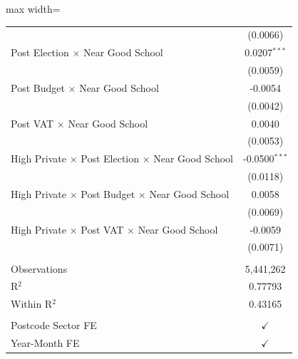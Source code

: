 \begin{table}[htbp]
\begin{adjustbox}{max width=\textwidth}
\begin{tabular}{lc}
                                                                              & (0.0066)\\
      Post Election $\times$ Near Good School                                 & 0.0207$^{***}$\\
                                                                              & (0.0059)\\
      Post Budget $\times$ Near Good School                                   & -0.0054\\
                                                                              & (0.0042)\\
      Post VAT $\times$ Near Good School                                      & 0.0040\\
                                                                              & (0.0053)\\
      High Private $\times$ Post Election $\times$ Near Good School           & -0.0500$^{***}$\\
                                                                              & (0.0118)\\
      High Private $\times$ Post Budget $\times$ Near Good School             & 0.0058\\
                                                                              & (0.0069)\\
      High Private $\times$ Post VAT $\times$ Near Good School                & -0.0059\\
                                                                              & (0.0071)\\   
       \\
      Observations                                                            & 5,441,262\\  
      R$^2$                                                                   & 0.77793\\  
      Within R$^2$                                                            & 0.43165\\  
       \\
      Postcode Sector FE                                                      & $\checkmark$\\
      Year-Month FE                                                           & $\checkmark$\\   
      \bottomrule
   \end{tabular}
   \end{adjustbox}


\end{table}
